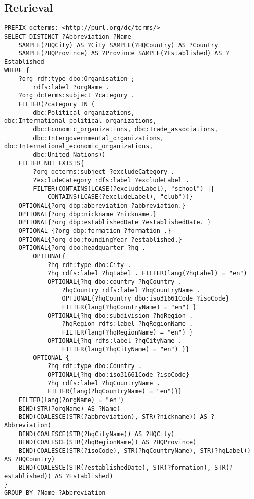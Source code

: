 \documentclass[11pt]{article}
\begin{document}
\subsection{Retrieval}
{\footnotesize\begin{verbatim}
PREFIX dcterms: <http://purl.org/dc/terms/>
SELECT DISTINCT ?Abbreviation ?Name
    SAMPLE(?HQCity) AS ?City SAMPLE(?HQCountry) AS ?Country
    SAMPLE(?HQProvince) AS ?Province SAMPLE(?Established) AS ?Established
WHERE {
    ?org rdf:type dbo:Organisation ;
        rdfs:label ?orgName .
    ?org dcterms:subject ?category .
    FILTER(?category IN (
        dbc:Political_organizations, dbc:International_political_organizations,
        dbc:Economic_organizations, dbc:Trade_associations,
        dbc:Intergovernmental_organizations, dbc:International_economic_organizations,
        dbc:United_Nations))
    FILTER NOT EXISTS{
        ?org dcterms:subject ?excludeCategory .
        ?excludeCategory rdfs:label ?excludeLabel .
        FILTER(CONTAINS(LCASE(?excludeLabel), "school") || 
            CONTAINS(LCASE(?excludeLabel), "club"))}
    OPTIONAL{?org dbp:abbreviation ?abbreviation.}
    OPTIONAL{?org dbp:nickname ?nickname.}
    OPTIONAL{?org dbp:establishedDate ?establishedDate. }
    OPTIONAL {?org dbp:formation ?formation .}
    OPTIONAL{?org dbo:foundingYear ?established.}
    OPTIONAL{?org dbo:headquarter ?hq . 
        OPTIONAL{
            ?hq rdf:type dbo:City .
            ?hq rdfs:label ?hqLabel . FILTER(lang(?hqLabel) = "en")
            OPTIONAL{?hq dbo:country ?hqCountry .
                ?hqCountry rdfs:label ?hqCountryName .
                OPTIONAL{?hqCountry dbo:iso31661Code ?isoCode}
                FILTER(lang(?hqCountryName) = "en") }
            OPTIONAL{?hq dbo:subdivision ?hqRegion .
                ?hqRegion rdfs:label ?hqRegionName .
                FILTER(lang(?hqRegionName) = "en") }
            OPTIONAL{?hq rdfs:label ?hqCityName .
                FILTER(lang(?hqCityName) = "en") }}    
        OPTIONAL {
            ?hq rdf:type dbo:Country .
            OPTIONAL{?hq dbo:iso31661Code ?isoCode}
            ?hq rdfs:label ?hqCountryName .
            FILTER(lang(?hqCountryName) = "en")}}
    FILTER(lang(?orgName) = "en")
    BIND(STR(?orgName) AS ?Name)
    BIND(COALESCE(STR(?abbreviation), STR(?nickname)) AS ?Abbreviation)
    BIND(COALESCE(STR(?hqCityName)) AS ?HQCity)
    BIND(COALESCE(STR(?hqRegionName)) AS ?HQProvince)
    BIND(COALESCE(STR(?isoCode), STR(?hqCountryName), STR(?hqLabel)) AS ?HQCountry)
    BIND(COALESCE(STR(?establishedDate), STR(?formation), STR(?established)) AS ?Established)
}
GROUP BY ?Name ?Abbreviation
\end{verbatim}}
\end{document}
